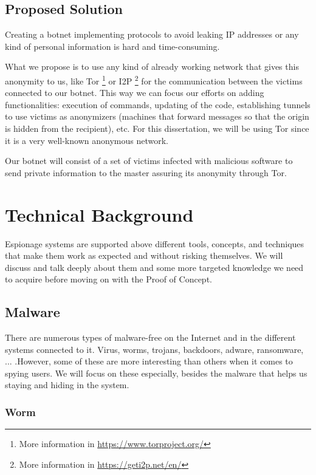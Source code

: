 \documentclass[11pt, a4paper,twoside]{tesi_upf}
\begin{document}
\section{Proposed Solution}

Creating a botnet implementing protocols to avoid leaking IP addresses or any kind of personal information is hard and time-consuming. 

What we propose is to use any kind of already working network that gives this anonymity to us, like Tor \footnote{More information in \url{https://www.torproject.org/}} or I2P \footnote{More information in \url{https://geti2p.net/en/}} for the communication between the victims connected to our botnet. This way we can focus our efforts on adding functionalities: execution of commands, updating of the code, establishing tunnels to use victims as anonymizers (machines that forward messages so that the origin is hidden from the recipient), etc. For this dissertation, we will be using Tor since it is a very well-known anonymous network.

Our botnet will consist of a set of victims infected with malicious software to send private information to the master assuring its anonymity through Tor.


\chapter{Technical Background}

Espionage systems are supported above different tools, concepts, and techniques that make them work as expected and without risking themselves. We will discuss and talk deeply about them and some more targeted knowledge we need to acquire before moving on with the Proof of Concept.

\section{Malware}

There are numerous types of malware-free on the Internet and in the different systems connected to it. Virus, worms, trojans, backdoors, adware, ransomware, ... .However, some of these are more interesting than others when it comes to spying users. We will focus on these especially, besides the malware that helps us staying and hiding in the system.

\subsection{Worm}
\end{document}
